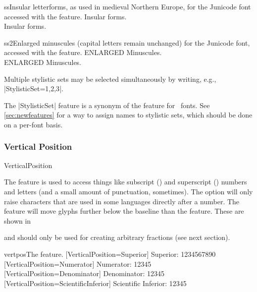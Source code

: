 \documentclass[a4paper]{l3doc}
\begin{document}
\begin{Lexample}{ss}{Insular letterforms, as used in medieval Northern Europe, for the Junicode font accessed with the  feature.}
   Insular forms. \\
   Insular forms. \\
\end{Lexample}

\begin{Lexample}{ss2}{Enlarged minuscules (capital letters remain unchanged) for the Junicode font, accessed with the  feature.}
   ENLARGED Minuscules. \\
   ENLARGED Minuscules. \\
\end{Lexample}

Multiple stylistic sets may be selected simultaneously by writing, e.g.,
|StylisticSet={1,2,3}|.

The |StylisticSet| feature is a synonym of the  feature for \AAT\ fonts.
See \vref{sec:newfeatures} for a way to assign names to stylistic sets, which should be done on a per-font basis.


\subsubsection{Vertical Position}

\begin{features}{VerticalPosition}
\end{features}

The  feature is used to access things like
subscript () and superscript () numbers and
letters (and a small amount of punctuation, sometimes).
The  option will only raise characters that are used
in some languages directly after a number.
The  feature will move glyphs
further below the baseline than the  feature.
These are shown in 

 and  should only be used for creating
arbitrary fractions (see next section).

\begin{Lexample}{vertpos}{The  feature.}
  [VerticalPosition=Superior]
   Superior: 1234567890                                   \\
  [VerticalPosition=Numerator]
   Numerator: 12345                                       \\
  [VerticalPosition=Denominator]
   Denominator: 12345                                     \\
  [VerticalPosition=ScientificInferior]
   Scientific Inferior: 12345
\end{Lexample}
\end{document}
